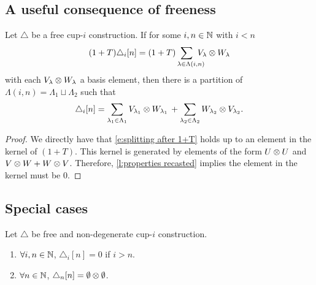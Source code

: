 \subsection{A useful consequence of freeness}

\begin{lemma} \label{l:splitting of summands}
	Let $\triangle$ be a free cup-$i$ construction.
	If for some $i,n \in \mathbb{N}$ with $i < n$
	\[
	(1+T) \triangle_i [n] =
	(1+T) \sum_{\lambda \in \Lambda(i,n) \kern-10pt} V_\lambda \ot W_\lambda
	\]
	with each $V_\lambda \otimes W_\lambda$ a basis element, then there is a partition of $\Lambda(i,n) = \Lambda_1 \sqcup \Lambda_2$ such that
	\begin{equation} \label{e:splitting after 1+T}
	\triangle_i [n] =
	\sum_{\lambda_1 \in \Lambda_1} V_{\lambda_1} \otimes W_{\lambda_1} \, +
	\sum_{\lambda_2 \in \Lambda_2} W_{\lambda_2} \otimes V_{\lambda_2}.
	\end{equation}
\end{lemma}

\begin{proof}
	We directly have that \eqref{e:splitting after 1+T} holds up to an element in the kernel of $(1+T)$.
	This kernel is generated by elements of the form $U \otimes U$ and $V \otimes W + W \otimes V$.
	Therefore, \cref{l:properties recasted} implies the element in the kernel must be $0$.
\end{proof}

\subsection{Special cases}

\begin{lemma} \label{l:special case one}
	Let $\triangle$ be free and non-degenerate cup-$i$ construction.
	\begin{enumerate}
		\item $\forall i,n \in \mathbb{N}$, $\triangle_i[n] = 0$ if $i > n$.
		\item $\forall n \in \mathbb{N}$, $\triangle_n[n] = \emptyset \otimes \emptyset$.
	\end{enumerate}
\end{lemma}

